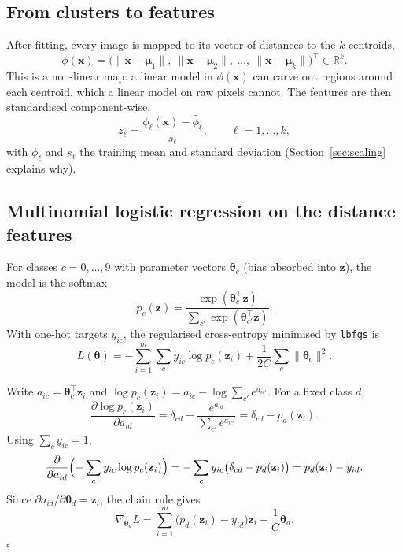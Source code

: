 \documentclass[11pt,a4paper]{article}
\newcommand{\R}{\mathbb{R}}
\newcommand{\x}{\mathbf{x}}
\newcommand{\z}{\mathbf{z}}
\newcommand{\vmu}{\boldsymbol{\mu}}
\newcommand{\vtheta}{\boldsymbol{\theta}}
\begin{document}
\subsection{From clusters to features}
After fitting, every image is mapped to its vector of distances to the $k$ centroids,
\begin{equation}\label{eq:featuremap}
  \phi(\x) = \bigl(\lVert\x-\vmu_1\rVert,\ \lVert\x-\vmu_2\rVert,\ \dots,\ \lVert\x-\vmu_k\rVert\bigr)^\top\in\R^{k}.
\end{equation}
This is a non-linear map: a linear model in $\phi(\x)$ can carve out regions around each centroid, which a linear
model on raw pixels cannot. The features are then standardised component-wise,
\begin{equation}
  z_\ell = \frac{\phi_\ell(\x)-\bar\phi_\ell}{s_\ell},\qquad \ell=1,\dots,k,
\end{equation}
with $\bar\phi_\ell$ and $s_\ell$ the training mean and standard deviation (Section~\ref{sec:scaling} explains why).

\subsection{Multinomial logistic regression on the distance features}
For classes $c=0,\dots,9$ with parameter vectors $\vtheta_c$ (bias absorbed into $\z$), the model is the softmax
\begin{equation}
  p_c(\z)=\frac{\exp(\vtheta_c^\top\z)}{\sum_{c'}\exp(\vtheta_{c'}^\top\z)} .
\end{equation}
With one-hot targets $y_{ic}$, the regularised cross-entropy minimised by \texttt{lbfgs} is
\begin{equation}\label{eq:ce}
  L(\vtheta)= -\sum_{i=1}^{m}\sum_{c}y_{ic}\log p_c(\z_i)+\frac{1}{2C}\sum_c\lVert\vtheta_c\rVert^2 .
\end{equation}

\begin{proofbox}
Write $a_{ic}=\vtheta_c^\top\z_i$ and $\log p_c(\z_i)=a_{ic}-\log\sum_{c'}e^{a_{ic'}}$. For a fixed class $d$,
\begin{equation*}
  \frac{\partial \log p_c(\z_i)}{\partial a_{id}}
  =\delta_{cd}-\frac{e^{a_{id}}}{\sum_{c'}e^{a_{ic'}}}=\delta_{cd}-p_d(\z_i).
\end{equation*}
Using $\sum_c y_{ic}=1$,
\begin{equation*}
  \frac{\partial}{\partial a_{id}}\Bigl(-\sum_c y_{ic}\log p_c(\z_i)\Bigr)
  =-\sum_c y_{ic}\bigl(\delta_{cd}-p_d(\z_i)\bigr)=p_d(\z_i)-y_{id}.
\end{equation*}
Since $\partial a_{id}/\partial\vtheta_d=\z_i$, the chain rule gives
\begin{equation*}
  \nabla_{\vtheta_d}L=\sum_{i=1}^{m}\bigl(p_d(\z_i)-y_{id}\bigr)\z_i+\frac{1}{C}\vtheta_d .
\end{equation*}
\hfill$\square$
\end{proofbox}
\end{document}
